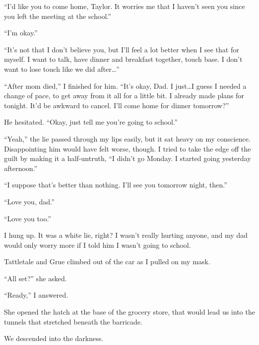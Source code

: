 ``I'd like you to come home, Taylor.  It worries me that I haven't seen you since you left the meeting at the school.''



``I'm okay.''



``It's not that I don't believe you, but I'll feel a lot better when I see that for myself.  I want to talk, have dinner and breakfast together, touch base.  I don't want to lose touch like we did after\ldots''



``After mom died,'' I finished for him.  ``It's okay, Dad.  I just\ldots I guess I needed a change of pace, to get away from it all for a little bit.  I already made plans for tonight.  It'd be awkward to cancel.  I'll come home for dinner tomorrow?''



He hesitated.  ``Okay, just tell me you're going to school.''



``Yeah,'' the lie passed through my lips easily, but it sat heavy on my conscience.  Disappointing him would have felt worse, though.  I tried to take the edge off the guilt by making it a half-untruth, ``I didn't go Monday.  I started going yesterday afternoon.''



``I suppose that's better than nothing.  I'll see you tomorrow night, then.''



``Love you, dad.''



``Love you too.''



I hung up.  It was a white lie, right?  I wasn't really hurting anyone, and my dad would only worry more if I told him I wasn't going to school.



Tattletale and Grue climbed out of the car as I pulled on my mask.



``All set?'' she asked.



``Ready,'' I answered.



She opened the hatch at the base of the grocery store, that would lead us into the tunnels that stretched beneath the barricade.



We descended into the darkness.





